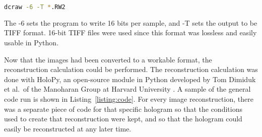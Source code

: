 \begin{center}
\begin{lstlisting}[frame=none, language=bash, numbers=none]
dcraw -6 -T *.RW2
\end{lstlisting}
\end{center}
The -6 sets the program to write 16 bits per sample, and
-T sets the output to be TIFF format.
16-bit TIFF files were used
since this format was lossless and easily usable in Python.

Now that the images had been converted to a workable format, the
reconstruction calculation could be performed. The reconstruction calculation was done with HoloPy,
an open-source module in Python developed by Tom Dimiduk et al.\ of the Manoharan Group at
Harvard University \cite{Manoharan}. A sample of the general code run is shown in
Listing~\ref{listing:code}. For every image reconstruction, there was a separate
piece of code for that specific hologram so that the conditions used to create
that reconstruction were kept, and so that the hologram could easily be
reconstructed at any later time.



